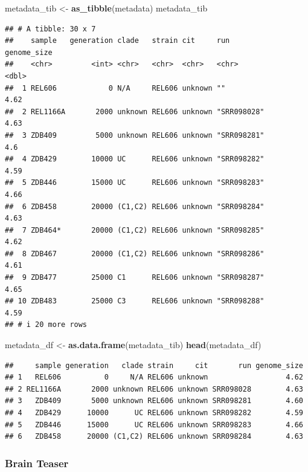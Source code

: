 \documentclass[
]{book}
\newenvironment{Shaded}{\begin{snugshade}}{\end{snugshade}}
\newcommand{\FunctionTok}[1]{\textcolor[rgb]{0.13,0.29,0.53}{\textbf{#1}}}
\newcommand{\NormalTok}[1]{#1}
\newcommand{\OtherTok}[1]{\textcolor[rgb]{0.56,0.35,0.01}{#1}}
\begin{document}
\begin{Shaded}
\begin{Highlighting}[]
\NormalTok{metadata\_tib }\OtherTok{\textless{}{-}} \FunctionTok{as\_tibble}\NormalTok{(metadata)}
\NormalTok{metadata\_tib}
\end{Highlighting}
\end{Shaded}

\begin{verbatim}
## # A tibble: 30 x 7
##    sample   generation clade   strain cit     run         genome_size
##    <chr>         <int> <chr>   <chr>  <chr>   <chr>             <dbl>
##  1 REL606            0 N/A     REL606 unknown ""                 4.62
##  2 REL1166A       2000 unknown REL606 unknown "SRR098028"        4.63
##  3 ZDB409         5000 unknown REL606 unknown "SRR098281"        4.6 
##  4 ZDB429        10000 UC      REL606 unknown "SRR098282"        4.59
##  5 ZDB446        15000 UC      REL606 unknown "SRR098283"        4.66
##  6 ZDB458        20000 (C1,C2) REL606 unknown "SRR098284"        4.63
##  7 ZDB464*       20000 (C1,C2) REL606 unknown "SRR098285"        4.62
##  8 ZDB467        20000 (C1,C2) REL606 unknown "SRR098286"        4.61
##  9 ZDB477        25000 C1      REL606 unknown "SRR098287"        4.65
## 10 ZDB483        25000 C3      REL606 unknown "SRR098288"        4.59
## # i 20 more rows
\end{verbatim}

\begin{Shaded}
\begin{Highlighting}[]
\NormalTok{metadata\_df }\OtherTok{\textless{}{-}} \FunctionTok{as.data.frame}\NormalTok{(metadata\_tib)}
\FunctionTok{head}\NormalTok{(metadata\_df)}
\end{Highlighting}
\end{Shaded}

\begin{verbatim}
##     sample generation   clade strain     cit       run genome_size
## 1   REL606          0     N/A REL606 unknown                  4.62
## 2 REL1166A       2000 unknown REL606 unknown SRR098028        4.63
## 3   ZDB409       5000 unknown REL606 unknown SRR098281        4.60
## 4   ZDB429      10000      UC REL606 unknown SRR098282        4.59
## 5   ZDB446      15000      UC REL606 unknown SRR098283        4.66
## 6   ZDB458      20000 (C1,C2) REL606 unknown SRR098284        4.63
\end{verbatim}

\subsubsection*{Brain Teaser}\label{brain-teaser}
\end{document}
